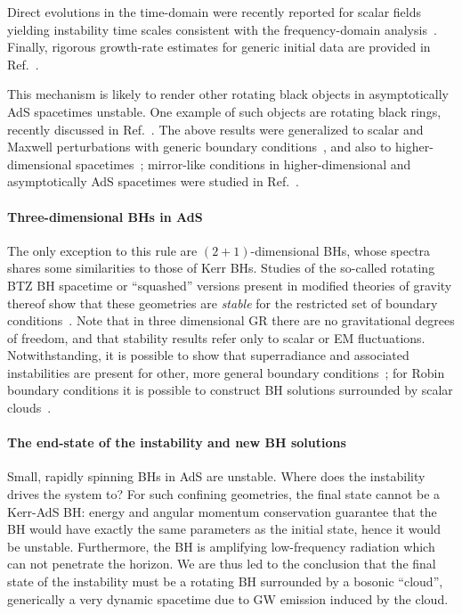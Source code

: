 \documentclass[11pt]{article}
\numberwithin{equation}{section} %
\begin{document}
Direct evolutions in the time-domain were recently reported for scalar fields yielding instability time scales consistent with the frequency-domain analysis~\cite{Cardoso:2015fga}.
Finally, rigorous growth-rate estimates for generic initial data are provided in Ref.~\cite{Shlapentokh-Rothman:2013ysa}.

This mechanism is likely to render other rotating black objects in asymptotically AdS spacetimes unstable.
One example of such objects are rotating black rings, recently discussed in Ref.~\cite{Figueras:2014dta}.
The above results were generalized to scalar and Maxwell perturbations with generic boundary conditions~\cite{Wang:2015goa,Ferreira:2017tnc}, and also to higher-dimensional spacetimes~\cite{Delice:2015zga,Li:2016kws}; mirror-like conditions in higher-dimensional and asymptotically AdS spacetimes were studied in Ref.~\cite{Huang:2016zoz}.




\paragraph{Three-dimensional BHs in AdS}
The only exception to this rule are $(2+1)$-dimensional BHs, whose spectra shares some similarities to those of Kerr BHs.
Studies of the so-called rotating BTZ BH spacetime or ``squashed'' versions present in modified theories of gravity 
thereof show that these geometries are {\it stable} for the restricted set of boundary conditions~\cite{Birmingham:2001pj,Ferreira:2013zta}. Note that in three dimensional 
GR there are no gravitational degrees of freedom, and that stability results refer only to scalar or EM fluctuations. Notwithstanding, it is possible to show that superradiance and associated instabilities are present for other, more general boundary conditions~\cite{Iizuka:2015vsa,Dappiaggi:2017pbe}; for Robin boundary conditions it is possible to construct BH solutions surrounded by scalar clouds~\cite{Ferreira:2017cta}.





\paragraph{The end-state of the instability and new BH solutions}
Small, rapidly spinning BHs in AdS are unstable. Where does the instability drives the system to? For such confining geometries, the final state cannot be a Kerr-AdS BH: energy and angular momentum conservation guarantee that the BH would have exactly the same parameters as the initial state, hence it would be unstable.
Furthermore, the BH is amplifying low-frequency radiation which can not penetrate the horizon.
We are thus led to the conclusion that the final state of the instability must be a rotating BH surrounded by a bosonic ``cloud'',
generically a very dynamic spacetime due to GW emission induced by the cloud.
\end{document}
